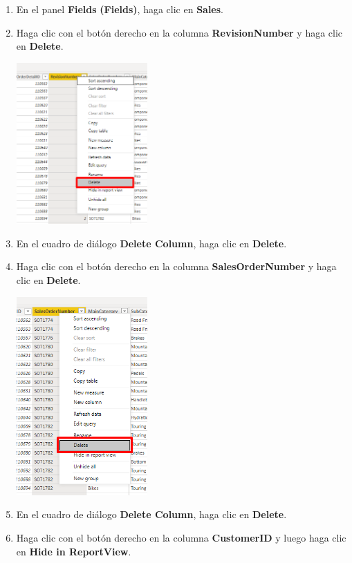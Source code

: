 \documentclass[12pt,letterpaper]{article}
\newcommand\tab[1][1cm]{\hspace*{#1}}
\begin{document}
\begin{enumerate}[\tab 1.]
        \item En el panel \textbf{Fields} \textbf{(Fields)}, haga clic en \textbf{Sales}.
        \item Haga clic con el botón derecho en la columna \textbf{RevisionNumber} y haga clic en \textbf{Delete}.
        \begin{center}
            \includegraphics[width=5cm]{./img/img36.png}
        \end{center}
        \item En el cuadro de diálogo \textbf{Delete Column}, haga clic en \textbf{Delete}.
        \item Haga clic con el botón derecho en la columna \textbf{SalesOrderNumber} y haga clic en \textbf{Delete}.
        \begin{center}
            \includegraphics[width=5cm]{./img/img38.png}
        \end{center}
        \item En el cuadro de diálogo \textbf{Delete Column}, haga clic en \textbf{Delete}.
        \item Haga clic con el botón derecho en la columna \textbf{CustomerID} y luego haga clic en \textbf{Hide in ReportView}.
        \begin{center}

\end{center}
\end{enumerate}
\end{document}
